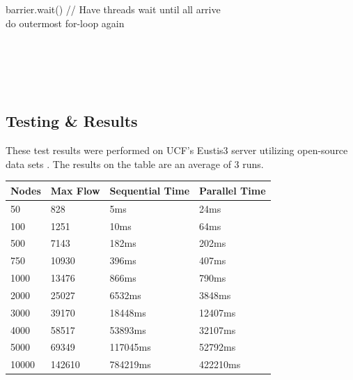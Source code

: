 \begin{algorithm}
\begin{algorithmic}[1]
                            barrier.wait() // Have threads wait until all arrive\\
                            do outermost for-loop again
                        \EndIf\\
                    \EndFor\\
            \end{algorithmic}\\
        \end{algorithm}\\

\subsection{Testing \& Results}
    These test results were performed on UCF's Eustis3 server utilizing open-source data sets \cite{sumitpadhiyar}. The results on the table are an average of 3 runs.
    \newline
    \begin{tabular}{ | m{4em} | m{5em }| m{5em} | m{5em} | } 
      \hline
      Nodes & Max Flow & Sequential Time & Parallel Time \\ 
      
        \hline
        50      & 828     & 5ms & 24ms\\
        \hline
        100     & 1251    & 10ms & 64ms\\  
        \hline
        500     & 7143    & 182ms & 202ms\\        
        \hline   
        750     & 10930   & 396ms & 407ms\\         
        \hline
        1000    & 13476   & 866ms & 790ms\\       
        \hline
        2000    & 25027   & 6532ms & 3848ms\\
        \hline
        3000    & 39170   & 18448ms & 12407ms\\       
        \hline
        4000    & 58517   & 53893ms & 32107ms\\
        \hline
        5000    & 69349   & 117045ms & 52792ms\\
        \hline
        10000   & 142610  & 784219ms & 422210ms\\
        \hline
    \end{tabular}
    
